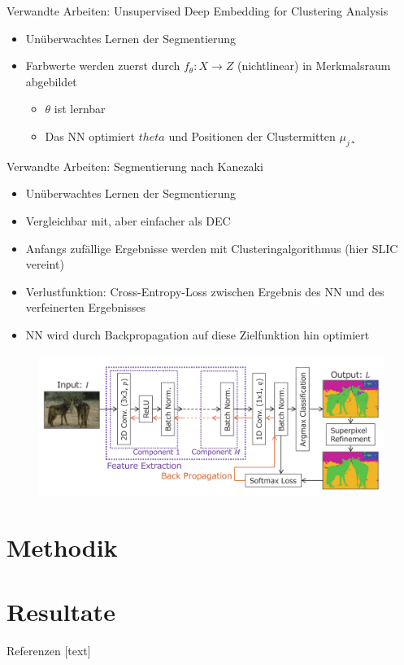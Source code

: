 \documentclass{beamer}
\begin{document}
\begin{frame}{Verwandte Arbeiten: Unsupervised Deep Embedding for Clustering Analysis \cite{junyuan_16}}
\begin{itemize}
	\item Unüberwachtes Lernen der Segmentierung
	\item Farbwerte werden zuerst durch $f_\theta:X\rightarrow Z$ (nichtlinear) in Merkmalsraum abgebildet
	\begin{itemize}
		\item $\theta$ ist lernbar
		\item Das NN optimiert $theta$ und Positionen der Clustermitten $\mu_j$¸
	\end{itemize}
\end{itemize}
\end{frame}

\begin{frame}[allowframebreaks]{Verwandte Arbeiten: Segmentierung nach Kanezaki \cite{kanezaki_18}}
	\begin{itemize}
		\item Unüberwachtes Lernen der Segmentierung
		\item Vergleichbar mit, aber einfacher als DEC
		\item Anfangs zufällige Ergebnisse werden mit Clusteringalgorithmus (hier SLIC \cite{achanta_10} vereint)
		\item Verlustfunktion: Cross-Entropy-Loss zwischen Ergebnis des NN und des verfeinerten Ergebnisses
		\item NN wird durch Backpropagation auf diese Zielfunktion hin optimiert
	\end{itemize}
	\begin{figure}
		\includegraphics[height=20ex,keepaspectratio]{gfx/Kan18_01.png}
	\end{figure}
\end{frame}

\section{Methodik}



\section{Resultate}



\begin{frame}[allowframebreaks]{Referenzen}
	[text]
	
	
\end{frame}
\end{document}
